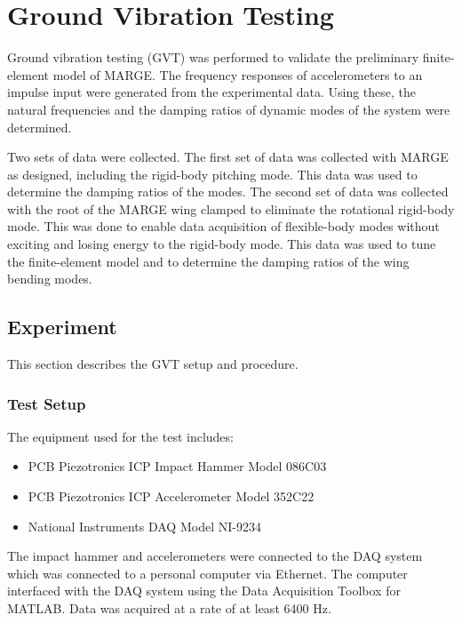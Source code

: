 \chapter{Ground Vibration Testing}
\label{ch:gvt}

Ground vibration testing (GVT) was performed to validate the preliminary finite-element model of MARGE. The frequency responses of accelerometers to an impulse input were generated from the experimental data. Using these, the natural frequencies and the damping ratios of dynamic modes of the system were determined.

Two sets of data were collected. The first set of data was collected with MARGE as designed, including the rigid-body pitching mode. This data was used to determine the damping ratios of the modes. The second set of data was collected with the root of the MARGE wing clamped to eliminate the rotational rigid-body mode. This was done to enable data acquisition of flexible-body modes without exciting and losing energy to the rigid-body mode. This data was used to tune the finite-element model and to determine the damping ratios of the wing bending modes.

\section{Experiment} %

This section describes the GVT setup and procedure.

\subsection{Test Setup}

The equipment used for the test includes:
\begin{itemize}
    \item PCB Piezotronics ICP Impact Hammer Model 086C03
    \item PCB Piezotronics ICP Accelerometer Model 352C22
    \item National Instruments DAQ Model NI-9234
\end{itemize}
The impact hammer and accelerometers were connected to the DAQ system which was connected to a personal computer via Ethernet. The computer interfaced with the DAQ system using the Data Acquisition Toolbox for MATLAB. Data was acquired at a rate of at least 6400 Hz.

